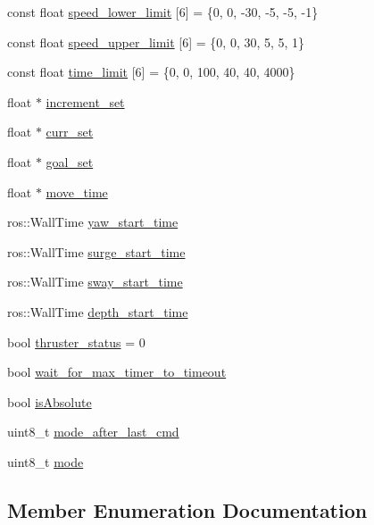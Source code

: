 \begin{DoxyCompactItemize}
const float \hyperlink{classControl_a8a4e9a6981c6adda2ca45420e7b035b8}{speed\+\_\+lower\+\_\+limit} \mbox{[}6\mbox{]} = \{0, 0, -\/30, -\/5, -\/5, -\/1\}
\item 
const float \hyperlink{classControl_a98641c8463a36108205726d108ebf101}{speed\+\_\+upper\+\_\+limit} \mbox{[}6\mbox{]} = \{0, 0, 30, 5, 5, 1\}
\item 
const float \hyperlink{classControl_ab6952c55a537ef9c92a874a72d5781b5}{time\+\_\+limit} \mbox{[}6\mbox{]} = \{0, 0, 100, 40, 40, 4000\}
\item 
float $\ast$ \hyperlink{classControl_abef1251d931160009073651757563fc9}{increment\+\_\+set}
\item 
float $\ast$ \hyperlink{classControl_a42067224edcba565aa68d4bf087e45e8}{curr\+\_\+set}
\item 
float $\ast$ \hyperlink{classControl_ac7a1ee49d8d049924d680f393b43842b}{goal\+\_\+set}
\item 
float $\ast$ \hyperlink{classControl_a4274ca145ba190a4d246b7b28d2553cc}{move\+\_\+time}
\item 
ros\+::\+Wall\+Time \hyperlink{classControl_a6934796a534d791ffea03448b383957b}{yaw\+\_\+start\+\_\+time}
\item 
ros\+::\+Wall\+Time \hyperlink{classControl_ac4d0e192a272517b5921915e65869b7b}{surge\+\_\+start\+\_\+time}
\item 
ros\+::\+Wall\+Time \hyperlink{classControl_a1d05716c729b56329776ab242498d2dd}{sway\+\_\+start\+\_\+time}
\item 
ros\+::\+Wall\+Time \hyperlink{classControl_af1c6dd9d0fe3364d6104754e251de910}{depth\+\_\+start\+\_\+time}
\item 
bool \hyperlink{classControl_a3de70e43f3432be0d75cff773f325421}{thruster\+\_\+status} = 0
\item 
bool \hyperlink{classControl_a91aff903721b3e11bc7e4ea1d621dfbf}{wait\+\_\+for\+\_\+max\+\_\+timer\+\_\+to\+\_\+timeout}
\item 
bool \hyperlink{classControl_aa01779cbcdef554d2e6c77e05d7b521a}{is\+Absolute}
\item 
uint8\+\_\+t \hyperlink{classControl_a8775fce3fa356ec18f05a199e2e018c4}{mode\+\_\+after\+\_\+last\+\_\+cmd}
\item 
uint8\+\_\+t \hyperlink{classControl_ad55ea3c85c8b2d428e7c9a6d92c80f25}{mode}
\end{DoxyCompactItemize}


\subsection{Member Enumeration Documentation}

